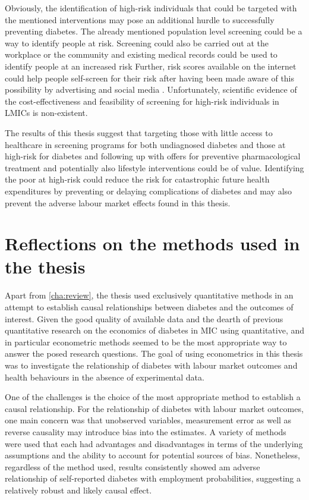 Obviously, the identification of high-risk individuals that could be targeted with the mentioned interventions may pose an additional hurdle to successfully preventing diabetes. The already mentioned population level screening could be a way to identify people at risk. Screening could also be carried out at the workplace or the community and existing medical records could be used to identify people at an increased risk Further, risk scores available on the internet could help people self-screen for their risk after having been made aware of this possibility by advertising and social media \parencite{Cefalu2016}. Unfortunately, scientific evidence of the cost-effectiveness and feasibility of screening for high-risk individuals in \acp{LMIC} is non-existent. 

The results of this thesis suggest that targeting those with little access to healthcare in screening programs for both undiagnosed diabetes and those at high-risk for diabetes and following up with offers for preventive pharmacological treatment and potentially also lifestyle interventions could be of value. Identifying the poor at high-risk could reduce the risk for catastrophic future health expenditures by preventing or delaying complications of diabetes and may also prevent the adverse labour market effects found in this thesis.


\section{Reflections on the methods used in the thesis}

Apart from \ref{cha:review}, the thesis used exclusively quantitative methods in an attempt to establish causal relationships between diabetes and the outcomes of interest. Given the good quality of available data and the dearth of previous quantitative research on the economics of diabetes in \ac{MIC} using quantitative, and in particular econometric methods seemed to be the most appropriate way to answer the posed research questions. The goal of using econometrics in this thesis was to investigate the relationship of diabetes with labour market outcomes and health behaviours in the absence of experimental data. 

One of the challenges is the choice of the most appropriate method to establish a causal relationship. For the relationship of diabetes with labour market outcomes, one main concern was that unobserved variables, measurement error as well as reverse causality may introduce bias into the estimates. A variety of methods were used that each had advantages and disadvantages in terms of the underlying assumptions and the ability to account for potential sources of bias. Nonetheless, regardless of the method used, results consistently showed am adverse relationship of self-reported diabetes with employment probabilities, suggesting a relatively robust and likely causal effect.

